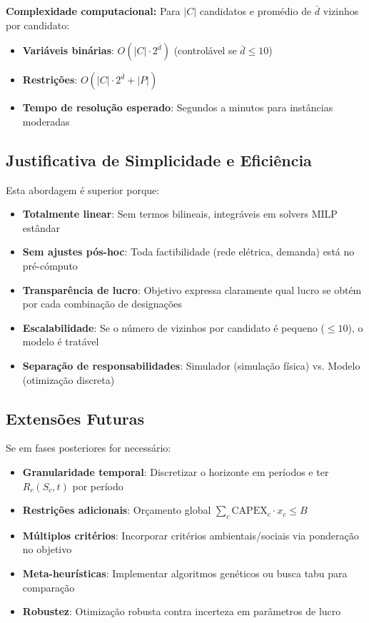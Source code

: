 \textbf{Complexidade computacional:} Para $|C|$ candidatos e promédio de $\bar{d}$ vizinhos por candidato:
\begin{itemize}
    \item \textbf{Variáveis binárias}: $O(|C| \cdot 2^{\bar{d}})$ (controlável se $\bar{d} \leq 10$)
    \item \textbf{Restrições}: $O(|C| \cdot 2^{\bar{d}} + |P|)$
    \item \textbf{Tempo de resolução esperado}: Segundos a minutos para instâncias moderadas
\end{itemize}

\subsection{Justificativa de Simplicidade e Eficiência}

Esta abordagem é superior porque:

\begin{itemize}
    \item \textbf{Totalmente linear}: Sem termos bilineais, integráveis em solvers MILP estândar
    \item \textbf{Sem ajustes pós-hoc}: Toda factibilidade (rede elétrica, demanda) está no pré-cómputo
    \item \textbf{Transparência de lucro}: Objetivo expressa claramente qual lucro se obtém por cada combinação de designações
    \item \textbf{Escalabilidade}: Se o número de vizinhos por candidato é pequeno ($\leq 10$), o modelo é tratável
    \item \textbf{Separação de responsabilidades}: Simulador (simulação física) vs. Modelo (otimização discreta)
\end{itemize}

\subsection{Extensões Futuras}

Se em fases posteriores for necessário:

\begin{itemize}
    \item \textbf{Granularidade temporal}: Discretizar o horizonte em períodos e ter $R_c(S_c, t)$ por período
    \item \textbf{Restrições adicionais}: Orçamento global $\sum_c \text{CAPEX}_c \cdot x_c \leq B$
    \item \textbf{Múltiplos critérios}: Incorporar critérios ambientais/sociais via ponderação no objetivo
    \item \textbf{Meta-heurísticas}: Implementar algoritmos genéticos ou busca tabu para comparação
    \item \textbf{Robustez}: Otimização robusta contra incerteza em parâmetros de lucro
\end{itemize}

